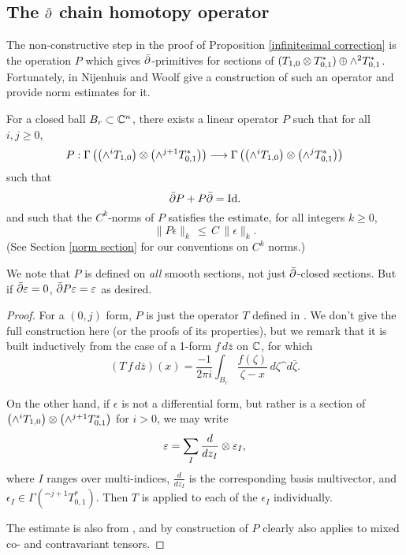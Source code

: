 \documentclass{article}
\begin{document}
\subsection{The $\bar{\partial}$ chain homotopy operator}

The non-constructive step in the proof of Proposition \ref{infinitesimal correction} is the operation $P$ which gives $\bar{\partial}$-primitives for sections of $(T_{1,0} \otimes T^*_{0,1}) \oplus \wedge ^2 T^*_{0,1}$.  Fortunately, in \cite{NijenhuisWoolf} Nijenhuis and Woolf give a construction of such an operator and provide norm estimates for it.

\begin{prop}\label{existence of P}
For a closed ball $B_r \subset \mathbb C^n$, there exists a linear operator $P$ such that for all $i,j\geq0$,
$$P : \Gamma\left(\left(\wedge ^i T_{1,0}\right) \otimes \left(\wedge ^{j+1} T^*_{0,1}\right)\right)
\longrightarrow \Gamma\left(\left(\wedge ^i T_{1,0}\right) \otimes \left(\wedge ^j T^*_{0,1}\right)\right)$$
such that
\begin{equation}\label{P error}
\bar\del P + P \bar\del = \Id.
\end{equation}
and such that the $C^k$-norms of $P$ satisfies the estimate, for all integers $k\geq0$,
$$\|P\epsilon\|_k \,\leq\, C\,\|\epsilon\|_k.$$
(See Section \ref{norm section} for our conventions on $C^k$ norms.)
\end{prop}

We note that $P$ is defined on \emph{all} smooth sections, not just $\bar{\partial}$-closed sections.  But if $\bar{\partial}\varepsilon=0$, $\bar{\partial} P\varepsilon = \varepsilon$ as desired.

\begin{proof}
For a $(0,j)$ form, $P$ is just the operator $T$ defined in \cite{NijenhuisWoolf}.  We don't give the full construction here (or the proofs of its properties), but we remark that it is built inductively from the case of a 1-form $f\,d\bar{z}$ on $\mathbb C$, for which
$$(T\, f\,d\bar{z}) (x) = \frac{-1}{2\pi i} \int_{B_r} \frac{f(\zeta)}{\zeta-x}\, d\zeta\^d\bar\zeta.$$

On the other hand, if $\epsilon$ is not a differential form, but rather is a section of $\left(\wedge ^i T_{1,0}\right) \otimes \left(\wedge ^{j+1} T^*_{0,1}\right)$ for $i>0$, we may write
$$\varepsilon = \sum_I \frac{d}{dz_I} \otimes \varepsilon_I,$$
where $I$ ranges over multi-indices, $\frac{d}{dz_I}$ is the corresponding basis multivector, and $\epsilon_I \in \Gamma\left(\^ ^{j+1} T^*_{0,1}\right)$.  Then $T$ is applied to each of the $\epsilon_I$ individually.

The estimate is also from \cite{NijenhuisWoolf}, and by construction of $P$ clearly also applies to mixed co- and contravariant tensors.
\end{proof}
\end{document}
